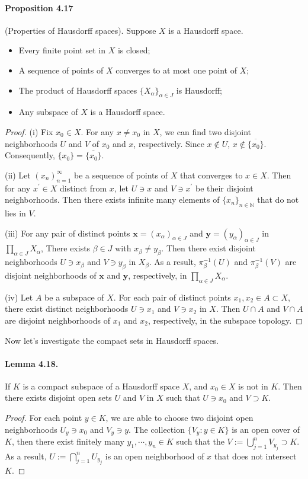 \documentclass{article}
\numberwithin{equation}{section}
\newcommand{\bbN}{\mathbb{N}}
\theoremstyle{plain}
\theoremstyle{definition}
\begin{document}
\paragraph{Proposition 4.17\label{prop:4.17}} (Properties of Hausdorff spaces). Suppose $X$ is a Hausdorff space.
\begin{itemize}
	\item[(i)] Every finite point set in $X$ is closed;
	\item[(ii)] A sequence of points of $X$ converges to at most one point of $X$;
	\item[(iii)] The product of Hausdorff spaces $\{X_\alpha\}_{\alpha\in J}$ is Hausdorff;
	\item[(iv)] Any subspace of $X$ is a Hausdorff space.
\end{itemize}
\begin{proof}
(i) Fix $x_0\in X$. For any $x\neq x_0$ in $X$, we can find two disjoint neighborhoods $U$ and $V$ of $x_0$ and $x$, respectively. Since $x\notin U$, $x\notin\overline{\{x_0\}}$. Consequently, $\{x_0\}=\overline{\{x_0\}}$.

(ii) Let $(x_n)_{n=1}^\infty$ be a sequence of points of $X$ that converges to $x\in X$. Then for any $x^\prime\in X$ distinct from $x$, let $U\ni x$ and $V\ni x^\prime$ be their disjoint neighborhoods. Then there exists infinite many elements of $\{x_n\}_{n\in\bbN}$ that do not lies in $V$.

(iii) For any pair of distinct points $\mathbf{x}=(x_\alpha)_{\alpha\in J}$ and $\mathbf{y}=(y_\alpha)_{\alpha\in J}$ in $\prod_{\alpha\in J}X_\alpha$, There exists $\beta\in J$ with $x_\beta\neq y_\beta$. Then there exist disjoint neighborhoods $U\ni x_\beta$ and $V\ni y_\beta$ in $X_\beta$. As a result, $\pi_\beta^{-1}(U)$ and $\pi_\beta^{-1}(V)$ are disjoint neighborhoods of $\mathbf{x}$ and $\mathbf{y}$, respectively, in $\prod_{\alpha\in J}X_\alpha$.

(iv) Let $A$ be a subspace of $X$. For each pair of distinct points $x_1,x_2\in A\subset X$, there exist distinct neighborhoods $U\ni x_1$ and $V\ni x_2$ in $X$. Then $U\cap A$ and $V\cap A$ are disjoint neighborhoods of $x_1$ and $x_2$, respectively, in the subspace topology.
\end{proof}

Now let's investigate the compact sets in Hausdorff spaces.

\paragraph{Lemma 4.18.\label{lemma:4.18}} If $K$ is a compact subspace of a Hausdorff space $X$, and $x_0\in X$ is not in $K$. Then there exists disjoint open sets $U$ and $V$ in $X$ such that $U\ni x_0$ and $V\supset K$.
\begin{proof}
For each point $y\in K$, we are able to choose two disjoint open neighborhoods $U_y\ni x_0$ and $V_y\ni y$. The collection $\{V_y:y\in K\}$ is an open cover of $K$, then there exist finitely many $y_1,\cdots,y_n\in K$ such that the $V:=\bigcup_{j=1}^n V_{y_j}\supset K$. As a result, $U:=\bigcap_{j=1}^nU_{y_j}$ is an open neighborhood of $x$ that does not intersect $K$.
\end{proof}
\end{document}
